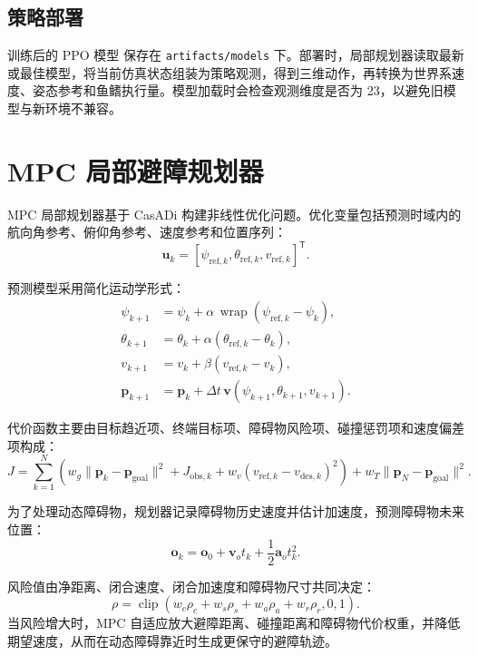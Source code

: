 \documentclass[UTF8,a4paper,12pt]{ctexart}
\begin{document}
\subsection{策略部署}

训练后的 PPO 模型\cite{schulman2017ppo} 保存在 \texttt{artifacts/models} 下。部署时，局部规划器读取最新或最佳模型，将当前仿真状态组装为策略观测，得到三维动作，再转换为世界系速度、姿态参考和鱼鳍执行量。模型加载时会检查观测维度是否为 23，以避免旧模型与新环境不兼容。

\section{MPC 局部避障规划器}

MPC 局部规划器基于 CasADi 构建非线性优化问题\cite{andersson2019casadi}。优化变量包括预测时域内的航向角参考、俯仰角参考、速度参考和位置序列：
\begin{equation}
\bm{u}_k = [\psi_{\mathrm{ref},k}, \theta_{\mathrm{ref},k}, v_{\mathrm{ref},k}]^\mathsf{T}.
\end{equation}

预测模型采用简化运动学形式：
\begin{align}
\psi_{k+1} &= \psi_k + \alpha\,\operatorname{wrap}(\psi_{\mathrm{ref},k}-\psi_k),\\
\theta_{k+1} &= \theta_k + \alpha(\theta_{\mathrm{ref},k}-\theta_k),\\
v_{k+1} &= v_k + \beta(v_{\mathrm{ref},k}-v_k),\\
\bm{p}_{k+1} &= \bm{p}_k + \Delta t\,\bm{v}(\psi_{k+1},\theta_{k+1},v_{k+1}).
\end{align}

代价函数主要由目标趋近项、终端目标项、障碍物风险项、碰撞惩罚项和速度偏差项构成：
\begin{equation}
J =
\sum_{k=1}^{N}
\left(
w_g\|\bm{p}_k-\bm{p}_{\mathrm{goal}}\|^2
+ J_{\mathrm{obs},k}
+ w_v(v_{\mathrm{ref},k}-v_{\mathrm{des},k})^2
\right)
+ w_T\|\bm{p}_N-\bm{p}_{\mathrm{goal}}\|^2.
\end{equation}

为了处理动态障碍物，规划器记录障碍物历史速度并估计加速度，预测障碍物未来位置：
\begin{equation}
\bm{o}_{k} =
\bm{o}_{0} + \bm{v}_{o}t_k + \frac{1}{2}\bm{a}_{o}t_k^2.
\end{equation}

风险值由净距离、闭合速度、闭合加速度和障碍物尺寸共同决定：
\begin{equation}
\rho =
\operatorname{clip}\left(
w_c \rho_c + w_s \rho_s + w_a \rho_a + w_r \rho_r,
0,1
\right).
\end{equation}
当风险增大时，MPC 自适应放大避障距离、碰撞距离和障碍物代价权重，并降低期望速度，从而在动态障碍靠近时生成更保守的避障轨迹。
\end{document}
